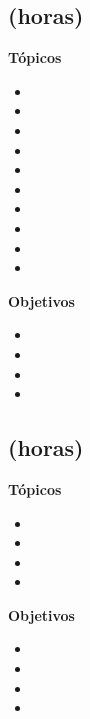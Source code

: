 \subsection{\DSTRESDef  (\DSTRESHours horas)}\label{sec:BOK-DS3}

\textbf{Tópicos}
\begin{itemize}
	\item \DSTRESTopicNociones
	\item \DSTRESTopicEstructura
	\item \DSTRESTopicPruebas
	\item \DSTRESTopicPruebasy
	\item \DSTRESTopicPruebaspor
	\item \DSTRESTopicPruebasporcontradiccion
	\item \DSTRESTopicInduccion
	\item \DSTRESTopicInduccionfuerte
	\item \DSTRESTopicDefiniciones
	\item \DSTRESTopicEl
\end{itemize}

\textbf{Objetivos}
\begin{itemize}
	\item \DSTRESObjUNO
	\item \DSTRESObjDOS
	\item \DSTRESObjTRES
	\item \DSTRESObjCUATRO
\end{itemize}

\subsection{\DSCUATRODef  (\DSCUATROHours horas)}\label{sec:BOK-DS4}

\textbf{Tópicos}
\begin{itemize}
	\item \DSCUATROTopicArgumentos
	\item \DSCUATROTopicPrincipio
	\item \DSCUATROTopicPermutaciones
	\item \DSCUATROTopicSolucion
\end{itemize}

\textbf{Objetivos}
\begin{itemize}
	\item \DSCUATROObjUNO
	\item \DSCUATROObjDOS
	\item \DSCUATROObjTRES
	\item \DSCUATROObjCUATRO
\end{itemize}

